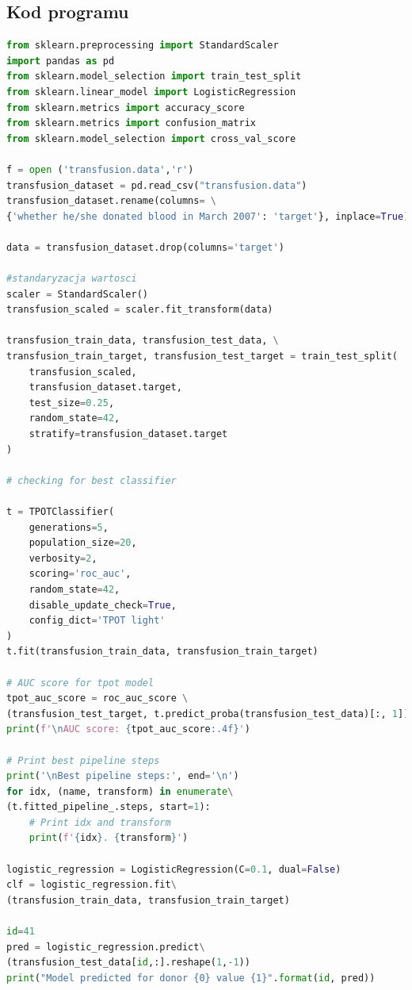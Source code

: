 \documentclass[11pt, a4paper, notitlepage]{report}
\begin{document}
\begin{appendices}
\chapter{Kod programu}
\begin{lstlisting}[language=Python]
from sklearn.preprocessing import StandardScaler
import pandas as pd
from sklearn.model_selection import train_test_split
from sklearn.linear_model import LogisticRegression
from sklearn.metrics import accuracy_score
from sklearn.metrics import confusion_matrix
from sklearn.model_selection import cross_val_score

f = open ('transfusion.data','r')
transfusion_dataset = pd.read_csv("transfusion.data")
transfusion_dataset.rename(columns= \
{'whether he/she donated blood in March 2007': 'target'}, inplace=True)

data = transfusion_dataset.drop(columns='target')

#standaryzacja wartosci
scaler = StandardScaler()
transfusion_scaled = scaler.fit_transform(data)

transfusion_train_data, transfusion_test_data, \
transfusion_train_target, transfusion_test_target = train_test_split(
    transfusion_scaled,
    transfusion_dataset.target,
    test_size=0.25,
    random_state=42,
    stratify=transfusion_dataset.target
)

# checking for best classifier

t = TPOTClassifier(
    generations=5,
    population_size=20,
    verbosity=2,
    scoring='roc_auc',
    random_state=42,
    disable_update_check=True,
    config_dict='TPOT light'
)
t.fit(transfusion_train_data, transfusion_train_target)

# AUC score for tpot model
tpot_auc_score = roc_auc_score \
(transfusion_test_target, t.predict_proba(transfusion_test_data)[:, 1])
print(f'\nAUC score: {tpot_auc_score:.4f}')

# Print best pipeline steps
print('\nBest pipeline steps:', end='\n')
for idx, (name, transform) in enumerate\
(t.fitted_pipeline_.steps, start=1):
    # Print idx and transform
    print(f'{idx}. {transform}')

logistic_regression = LogisticRegression(C=0.1, dual=False)
clf = logistic_regression.fit\
(transfusion_train_data, transfusion_train_target)

id=41
pred = logistic_regression.predict\
(transfusion_test_data[id,:].reshape(1,-1))
print("Model predicted for donor {0} value {1}".format(id, pred))


\end{lstlisting}
\end{appendices}
\end{document}
